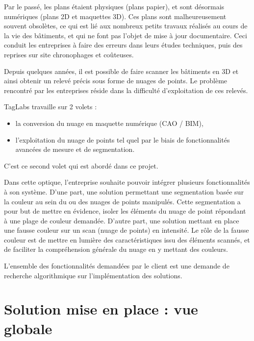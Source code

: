 \documentclass[12pt,titlepage,french]{article}
\begin{document}
Par le passé, les plans étaient physiques (plans papier), et sont désormais numériques (plans 2D et maquettes 3D). Ces plans sont malheureusement souvent obsolètes, ce qui est lié aux nombreux petits travaux réalisés au cours de la vie des bâtiments, et qui ne font pas l’objet de mise à jour documentaire. Ceci conduit les entreprises à faire des erreurs dans leurs études techniques, puis des reprises sur site chronophages et coûteuses.\newline

Depuis quelques années, il est possible de faire scanner les bâtiments en 3D et ainsi obtenir un relevé précis sous forme de nuages de points. Le problème rencontré par les entreprises réside dans la difficulté d’exploitation de ces relevés.\newline

TagLabs travaille sur 2 volets :

\begin{itemize}
    \item la conversion du nuage en maquette numérique (CAO / BIM),
    \item l’exploitation du nuage de points tel quel par le biais de fonctionnalités avancées de mesure et de segmentation. \newline
\end{itemize}

C’est ce second volet qui est abordé dans ce projet. \newline

Dans cette optique, l'entreprise souhaite pouvoir intégrer plusieurs fonctionnalités à son système. D'une part, une solution permettant une segmentation basée sur la couleur au sein du ou des nuages de points manipulés. Cette segmentation a pour but de mettre en évidence, isoler les éléments du nuage de point répondant à une plage de couleur demandée. D'autre part, une solution mettant en place une fausse couleur sur un scan (nuage de points) en intensité. Le rôle de la fausse couleur est de mettre en lumière des caractéristiques issu des éléments scannés, et de faciliter la compréhension générale du nuage en y mettant des couleurs. \newline

L'ensemble des fonctionnalités demandées par le client est une demande de recherche algorithmique sur l'implémentation des solutions.

\section{Solution mise en place : vue globale}
\end{document}

